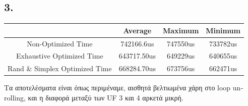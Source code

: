 \documentclass{article}
\newcommand{\english}[1]{\foreignlanguage{english}{{#1}}}
\begin{document}
\subsection*{3.}
\begin{otherlanguage}{english}
    \begin{center}
        \begin{tabular}{|c|c|c|c|}\hline
            & Average & Maximum & Minimum \\ \hline
            Non-Optimized Time &  742166.6us & 747550us & 733782us\\ \hline
            Exhaustive Optimized Time &  643717.50us & 649229us & 640655us\\ \hline
            Rand \& Simplex Optimized Time &  668284.70us & 673756us & 662471us\\ \hline
       \end{tabular}
    \end{center}
\end{otherlanguage}
Τα αποτελέσματα είναι όπως περιμέναμε, αισθητά βελτιωμένα χάρη στο \english{loop unrolling}, και η διαφορά μεταξύ των \english{UF} 3 και 4 αρκετά μικρή.
\end{document}
